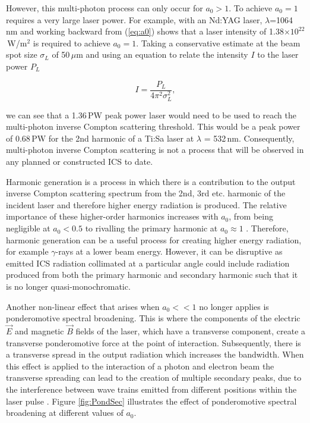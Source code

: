 \documentclass[11pt]{article}
\begin{document}
However, this multi-photon process can only occur for $a_{0} > 1$. To achieve $a_{0} = 1$ requires a very large laser power. For example, with an Nd:YAG laser, $\lambda$=1064\,nm and working backward from (\ref{eq:a0}) shows that a laser intensity of 1.38$\times 10^{22}$\,W/m$^{2}$ is required to achieve $a_{0} = 1$. Taking a conservative estimate at the beam spot size $\sigma_{L}$ of 50\,$\mu$m and using an equation to relate the intensity $I$ to the laser power $P_{L}$

\begin{equation}
I = \frac{P_{L}}{4\pi^{2}\sigma^{2}_{L}},
\label{equation}
\end{equation}

\noindent we can see that a 1.36\,PW peak power laser would need to be used to reach the multi-photon inverse Compton scattering threshold. This would be a peak power of 0.68\,PW for the 2nd harmonic of a Ti:Sa laser at $\lambda$ = 532\,nm. Consequently, multi-photon inverse Compton scattering is not a process that will be observed in any planned or constructed ICS to date.

\vspace{5mm}

Harmonic generation is a process in which there is a contribution to the output inverse Compton scattering spectrum from the 2nd, 3rd etc. harmonic of the incident laser and therefore higher energy radiation is produced. The relative importance of these higher-order harmonics increases with $a_{0}$, from being negligible at $a_{0} < 0.5$ to rivalling the primary harmonic at $a_{0} \approx 1$ \cite{KrafftTerzic2016}. Therefore, harmonic generation can be a useful process for creating higher energy radiation, for example $\gamma$-rays at a lower beam energy. However, it can be disruptive as emitted ICS radiation collimated at a particular angle could include  radiation produced from both the primary harmonic and secondary harmonic such that it is no longer quasi-monochromatic.

\vspace{5mm}

Another non-linear effect that arises when $a_{0} << 1$ no longer applies is ponderomotive spectral broadening. This is where the components of the electric $\overrightarrow{E}$ and magnetic $\overrightarrow{B}$ fields  of the laser, which have a transverse component, create a transverse ponderomotive force at the point of interaction. Subsequently, there is a transverse spread in the output radiation which increases the bandwidth. When this effect is applied to the interaction of a photon and electron beam the transverse spreading can lead to the creation of multiple secondary peaks, due to the interference between wave trains emitted from different positions within the laser pulse \cite{PetrilloPond}. Figure \ref{fig:PondSec} illustrates the effect of ponderomotive spectral broadening at different values of $a_{0}$.
\end{document}
